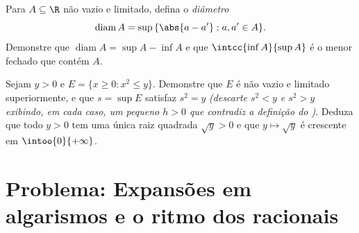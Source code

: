 \begin{exercise}[$\star\star$]\label{exo:b1:reals:11}
Para $A \subseteq \R$ não vazio e limitado, defina o
\emph{diâmetro}
\[
\operatorname{diam} A = \sup\,\{\abs{a - a'} : a, a' \in A\} .
\]
Demonstre que $\operatorname{diam} A = \sup A - \inf A$ e que
$\intcc{\inf A}{\sup A}$ é o menor  fechado
que contém $A$.
\end{exercise}

\begin{exercise}[$\star\star\star$]\label{exo:b1:reals:12}
Sejam $y > 0$ e $E = \{x \geq 0 : x^2 \leq y\}$. Demonstre que $E$ é
não vazio e limitado superiormente, e que $s = \sup E$ satisfaz $s^2 =
y$ \emph{(descarte $s^2 < y$ e $s^2 > y$ exibindo, em cada
caso, um pequeno $h > 0$ que contradiz a definição do
)}. Deduza que todo $y > 0$ tem uma única raiz quadrada
$\sqrt y > 0$ e que $y \mapsto \sqrt y$ é crescente em
$\intoo{0}{+\infty}$.
\end{exercise}

\section{Problema: Expansões em algarismos e o ritmo dos racionais}

